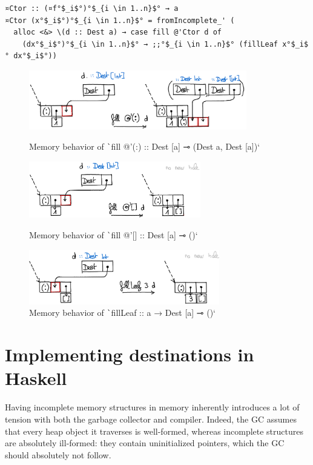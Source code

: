 \documentclass[english]{jflart}
\newlength{\currentparskip}
\newenvironment{unbreakable}
{%
  \setlength{\currentparskip}{\parskip}%
  \setlength{\parskip}{\currentparskip}%
  \par\vspace{0.5\baselineskip}%
  \noindent\begin{minipage}{\textwidth}%
    \setlength{\parskip}{\currentparskip}%
}
{%
  \end{minipage}%
  \par\vspace{0.5\baselineskip}%
}
\begin{document}
\begin{unbreakable}
{\small
\begin{verbatim}
¤Ctor :: (¤f°$_i$°)°$_{i \in 1..n}$° → a
¤Ctor (x°$_i$°)°$_{i \in 1..n}$° = fromIncomplete_' (
  alloc <&> \(d :: Dest a) → case fill @'Ctor d of
    (dx°$_i$°)°$_{i \in 1..n}$° → ;;°$_{i \in 1..n}$° (fillLeaf x°$_i$° dx°$_i$°))
\end{verbatim}
}
\end{unbreakable}

\begin{figure}[t]\centering
  \includegraphics[width=9.5cm]{fillCons.png}
  \caption{Memory behavior of \texttt`fill @'(:) :: Dest [a] ⊸ (Dest a, Dest [a])`}
  \label{fig:schema-fillCons}

  \includegraphics[width=7.5cm]{fillNil.png}
  \caption{Memory behavior of \texttt`fill @'[] :: Dest [a] ⊸ ()`}
  \label{fig:schema-fillNil}

  \includegraphics[width=8.3cm]{fillLeaf.png}
  \caption{Memory behavior of \texttt`fillLeaf :: a → Dest [a] ⊸ ()`}
  \label{fig:schema-fillLeaf}
\end{figure}

\section{Implementing destinations in Haskell}\label{sec:implementation}

Having incomplete memory structures in memory inherently introduces a lot of tension with both the garbage collector and compiler. Indeed, the GC assumes that every heap object it traverses is well-formed, whereas incomplete structures are absolutely ill-formed: they contain uninitialized pointers, which the GC should absolutely not follow.
\end{document}
